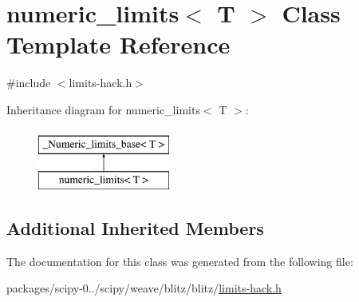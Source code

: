 \hypertarget{classnumeric__limits}{}\section{numeric\+\_\+limits$<$ T $>$ Class Template Reference}
\label{classnumeric__limits}


{\ttfamily \#include $<$limits-\/hack.\+h$>$}

Inheritance diagram for numeric\+\_\+limits$<$ T $>$\+:\begin{figure}[H]
\begin{center}
\leavevmode
\includegraphics[height=2.000000cm]{classnumeric__limits}
\end{center}
\end{figure}
\subsection*{Additional Inherited Members}


The documentation for this class was generated from the following file\+:\begin{DoxyCompactItemize}
\item 
packages/scipy-\/0../scipy/weave/blitz/blitz/\hyperlink{limits-hack_8h}{limits-\/hack.\+h}\end{DoxyCompactItemize}
